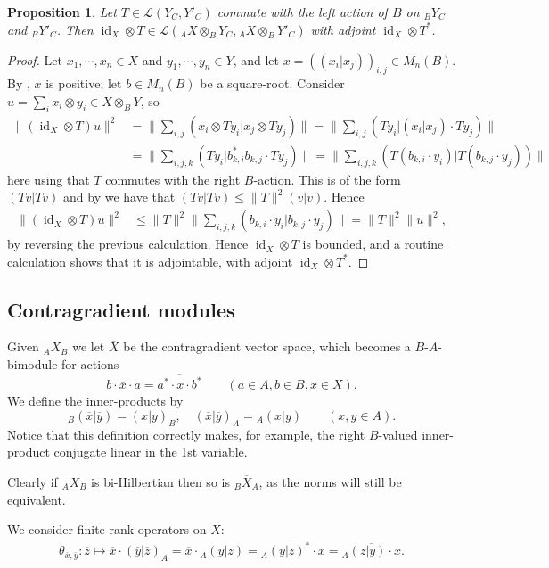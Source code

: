 \documentclass[a4paper,11pt]{article}
\theoremstyle{plain}
\newtheorem{proposition}{Proposition}[section]
\theoremstyle{remark}
\newcommand{\mc}[1]{\mathcal{#1}}
\newcommand{\id}{\operatorname{id}}
\begin{document}
\begin{proposition}\label{prop:action_other_side}
Let $T\in\mc L(Y_C, Y'_C)$ commute with the left action of $B$ on ${}_BY_C$ and ${}_BY'_C$.  Then $\id_X\otimes T \in \mc L({}_AX \otimes_B Y_C, {}_AX \otimes_B Y'_C)$ with adjoint $\id_X\otimes T^*$.
\end{proposition}
\begin{proof}
Let $x_1,\cdots,x_n \in X$ and $y_1,\cdots,y_n \in Y$, and let $x = ((x_i|x_j))_{i,j} \in M_n(B)$.  By \cite[Lemma~4.2]{Lance_HilbModsBook}, $x$ is positive; let $b \in M_n(B)$ be a square-root.  Consider $u = \sum_i x_i\otimes y_i \in X\otimes_B Y$, so
\begin{align*}
\big\| (\id_X\otimes T)u \big\|^2
&= \Big\| \sum_{i,j} (x_i\otimes Ty_i|x_j\otimes Ty_j) \Big\| 
= \Big\| \sum_{i,j} (Ty_i|(x_i|x_j) \cdot Ty_j) \Big\|  \\
&= \Big\| \sum_{i,j,k} (Ty_i | b^*_{k,i} b_{k,j} \cdot Ty_j )  \Big\|
= \Big\| \sum_{i,j,k} (T( b_{k,i}\cdot y_i) | T( b_{k,j} \cdot y_j) )  \Big\|
\end{align*}
here using that $T$ commutes with the right $B$-action.  This is of the form $(Tv|Tv)$ and by \cite[Proposition~1.2]{Lance_HilbModsBook} we have that $(Tv|Tv) \leq \|T\|^2 (v|v)$.  Hence
\begin{align*}
\big\| (\id_X\otimes T)u \big\|^2
&\leq \|T\|^2 \Big\| \sum_{i,j,k} (b_{k,i}\cdot y_i | b_{k,j} \cdot y_j )  \Big\|
= \|T\|^2 \|u\|^2,
\end{align*}
by reversing the previous calculation.  Hence $\id_X\otimes T$ is bounded, and a routine calculation shows that it is adjointable, with adjoint $\id_X\otimes T^*$.
\end{proof}
  

\subsection{Contragradient modules}\label{sec:contragradient}

Given ${}_AX_B$ we let $\overline X$ be the contragradient vector space, which becomes a $B$-$A$-bimodule for actions
\[ b \cdot \overline{x} \cdot a = \overline{ a^*\cdot x\cdot b^* }
\qquad (a\in A, b\in B, x\in X). \]
We define the inner-products by
\[ {}_B(\overline x|\overline y) = (x|y)_B, \quad
(\overline x|\overline y)_A = {}_A(x|y) \qquad (x,y\in A). \]
Notice that this definition correctly makes, for example, the right $B$-valued inner-product conjugate linear in the 1st variable.

Clearly if ${}_AX_B$ is bi-Hilbertian then so is ${}_B\overline X_A$, as the norms will still be equivalent.

We consider finite-rank operators on $\overline X$:
\begin{equation} \label{eq:finite_rank_contra}
\theta_{\overline x,\overline y} \colon \overline  z \mapsto \overline x \cdot (\overline y|\overline z)_A = \overline x \cdot {}_A(y|z) = \overline{ {}_A(y|z)^* \cdot x }
= \overline{ {}_A(z|y)\cdot x }.
\end{equation}

%
%

\end{document}

